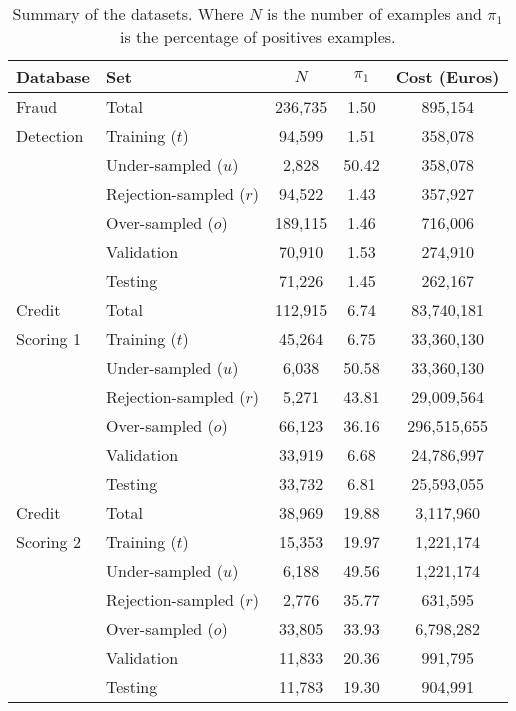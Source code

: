 \begin{table}[ht!]
  \centering
  \footnotesize
  \begin{tabular}{l l c c c } %
    \hline
    \textbf{Database}& \textbf{Set}&  $N$ & $\pi_1$ & Cost (Euros) \\
    \hline
    Fraud &Total&236,735&1.50&895,154\\
    Detection&  Training ($t$)&94,599&1.51&358,078\\
    &Under-sampled ($u$)&2,828&50.42&358,078\\
    &Rejection-sampled ($r$)&94,522&1.43&357,927\\
    &Over-sampled ($o$)&189,115&1.46&716,006\\
    &Validation&70,910&1.53&274,910\\
    &Testing&71,226&1.45&262,167\\
    \hline
    Credit  & Total&112,915&6.74&83,740,181\\
    Scoring 1 & Training ($t$)&45,264&6.75&33,360,130\\
    &Under-sampled ($u$)&6,038&50.58&33,360,130\\
    &Rejection-sampled ($r$)&5,271&43.81&29,009,564\\
    &Over-sampled ($o$)&66,123&36.16&296,515,655\\
    &Validation&33,919&6.68&24,786,997\\
    &Testing&33,732&6.81&25,593,055\\
    \hline
    Credit &Total&38,969&19.88&3,117,960\\
    Scoring 2&Training ($t$)&15,353&19.97&1,221,174\\
    &Under-sampled ($u$)&6,188&49.56&1,221,174\\
    &Rejection-sampled ($r$)&2,776&35.77&631,595\\
    &Over-sampled ($o$)&33,805&33.93&6,798,282\\
    &Validation&11,833&20.36&991,795\\
    &Testing&11,783&19.30&904,991\\
    \hline
  \end{tabular}
  \caption{Summary of the datasets. Where $N$ is the number of examples and $\pi_1$ is the 
  percentage of positives examples.}
  \label{tab:4:databases}
\end{table}

\makeatletter
\setlength{\@fptop}{0pt}
\makeatother